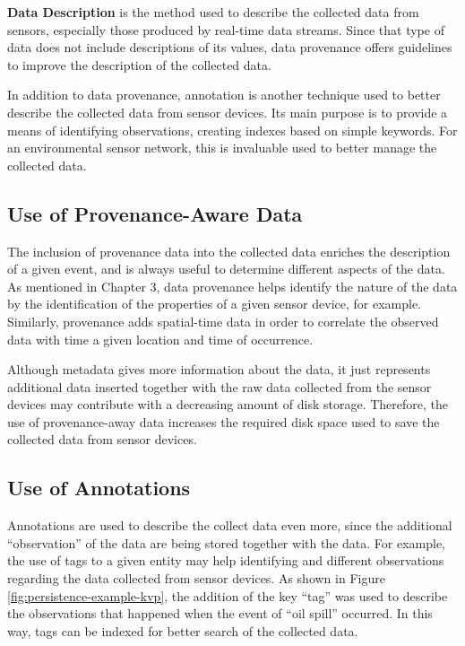 \textbf{Data Description} is the method used to describe the collected data
from sensors, especially those produced by real-time data streams. Since that
type of data does not include descriptions of its values, data provenance
offers guidelines to improve the description of the collected data.

In addition to data provenance, annotation is another technique used to
better describe the collected data from sensor devices. Its main purpose is to
provide a means of identifying observations, creating indexes based on simple
keywords. For an environmental sensor network, this is invaluable used to
better manage the collected data.

\subsection{Use of Provenance-Aware Data}

The inclusion of provenance data into the collected data enriches the
description of a given event, and is always useful to determine different
aspects of the data. As mentioned in Chapter 3, data provenance helps identify
the nature of the data by the identification of the properties of a given
sensor device, for example. Similarly, provenance adds spatial-time data in
order to correlate the observed data with time a given location and time of
occurrence.

Although metadata gives more information about the data, it just
represents additional data inserted together with the raw data collected
from the sensor devices may contribute with a decreasing amount of disk
storage. Therefore, the use of provenance-away data increases the required
disk space used to save the collected data from sensor devices.

\subsection{Use of Annotations}

Annotations are used to describe the collect data even more, since the
additional ``observation'' of the data are being stored together with the data.
For example, the use of tags to a given entity may help identifying and different
observations regarding the data collected from sensor devices. As shown in
Figure \ref{fig:persistence-example-kvp}, the addition of the key ``tag'' was
used to describe the observations that happened when the event of ``oil spill''
occurred. In this way, tags can be indexed for better search of the collected
data.

